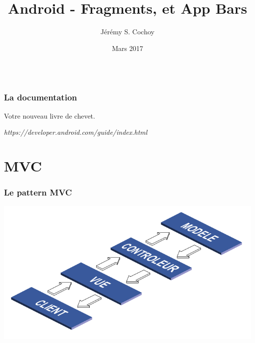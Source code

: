 \documentclass{beamer}
\begin{document}
\title{Android - Fragments, et App Bars}
\author{Jérémy S. Cochoy}
\date{Mars 2017}


\begin{frame}
\titlepage
\end{frame}

\begin{frame}
  \begin{columns}[t]
  \begin{column}{5cm}
  \tableofcontents[sections={1-3}]
  \end{column}
  \begin{column}{5cm}
  \tableofcontents[sections={4-8}]
  \end{column}
  \end{columns}
\end{frame}

\begin{frame}
\frametitle{La documentation}

\begin{block}{Votre nouveau livre de chevet.}
\begin{center}
\emph{https://developer.android.com/guide/index.html}
\end{center}
\end{block}

\end{frame}

\section{MVC}

\begin{frame}
\frametitle{Le pattern MVC}
\begin{center}
\includegraphics[scale=0.4]{mvc_intro.png}
\end{center}
\end{frame}
\end{document}
